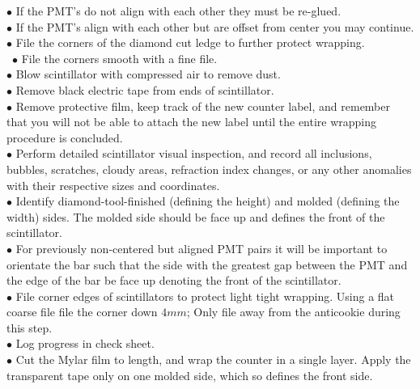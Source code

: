 $\bullet$ If the PMT's do not align with each other they must be re-glued.\\
$\bullet$ If the PMT's align with each other but are offset from center you may continue.\\
$\bullet$ File the corners of the diamond cut ledge to further protect wrapping.\\\
$\bullet$ File the corners smooth with a fine file.\\
$\bullet$ Blow scintillator with compressed air to remove dust.\\
$\bullet$ Remove black electric tape from ends of scintillator.\\
$\bullet$ Remove protective film, keep track of the new counter label, and remember that
you will not be able to attach the new label until the entire wrapping procedure
is concluded.\\
$\bullet$ Perform detailed scintillator visual inspection, and record all inclusions,
bubbles, scratches, cloudy areas, refraction index changes, or any other
anomalies with their respective sizes and coordinates.\\
$\bullet$ Identify diamond-tool-finished (defining the height) and molded (defining the
width) sides. The molded side should be face up and defines the front of the
scintillator.\\
$\bullet$ For previously non-centered but aligned PMT pairs it will be important to orientate the bar such that the side with the greatest gap between the PMT and the edge of the bar be face up denoting the front of the scintillator.\\
$\bullet$ File corner edges of scintillators to protect light tight wrapping. Using a flat coarse file file the corner down $4 mm$; Only file away from the anticookie during this step.\\
$\bullet$ Log progress in check sheet.\\
$\bullet$ Cut the Mylar film to length, and wrap the counter in a single layer. Apply the transparent tape only on one molded side, which so defines the front side.\\

